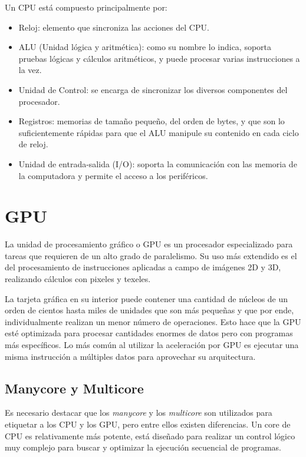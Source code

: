 Un CPU está compuesto principalmente por:
\begin{itemize}
\item Reloj: elemento que sincroniza las acciones del CPU.
\item ALU (Unidad lógica y aritmética): como su nombre lo indica, soporta pruebas lógicas y cálculos aritméticos, y puede procesar varias instrucciones a la vez.
\item Unidad de Control: se encarga de sincronizar los diversos componentes del procesador.
\item Registros: memorias de tamaño pequeño, del orden de bytes, y que son lo suficientemente rápidas para que el ALU manipule su contenido en cada ciclo de reloj.
\item Unidad de entrada-salida (I/O): soporta la comunicación con las memoria de la computadora y permite el acceso a los periféricos.
\end{itemize}   

    \section{GPU}
   
    La unidad de procesamiento gráfico o GPU es un procesador especializado para tareas que requieren de un alto grado de paralelismo. Su uso más extendido es el del procesamiento de instrucciones aplicadas a campo de imágenes 2D y 3D, realizando cálculos con pixeles y texeles\cite{TX2CU}.
    
    
    
   \vspace{0.3cm}
   
   La tarjeta gráfica en su interior puede contener una cantidad de núcleos de un orden de cientos hasta miles de unidades que son más pequeñas y que por ende, individualmente realizan un menor número de operaciones. Esto hace que la GPU esté optimizada para procesar cantidades enormes de datos pero con programas más específicos\cite{gpgpu}. Lo más común al utilizar la aceleración por GPU es ejecutar una misma instrucción a múltiples datos para aprovechar su arquitectura.

    \subsection{Manycore y Multicore}
    Es necesario destacar que los \textit{manycore} y los \textit{multicore} son utilizados para etiquetar a los CPU y los GPU, pero entre ellos existen diferencias. Un core de CPU es relativamente más potente, está diseñado para realizar un control lógico muy complejo para buscar y optimizar la ejecución secuencial de programas.
   
